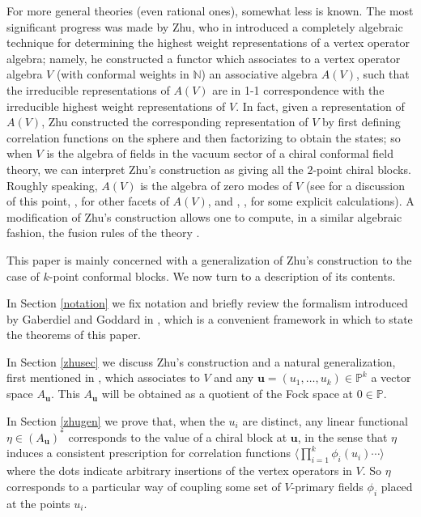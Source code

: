 \documentclass[a4paper,12pt]{article}
\newcommand{\N}{{\mathbb N}}
\newcommand{\uu}{{\mathbf u}}
\newcommand{\PP}{{\mathbb P}}
\newcommand{\IP}[1]{\langle#1\rangle}
\begin{document}
For more general theories (even rational ones), somewhat less is known.
The most significant progress was made by Zhu,
who in \cite{Zhu} introduced a completely algebraic technique for determining the highest weight representations of
a vertex operator algebra; namely, he constructed a functor which associates to a vertex operator
algebra $V$ (with conformal weights in $\N$) 
an associative algebra $A(V)$,
such that the irreducible representations of $A(V)$ are in 1-1 correspondence
with the irreducible highest weight representations of $V$.  In fact, given a representation of $A(V)$,
Zhu constructed the corresponding representation
of $V$ by first defining correlation functions on the sphere and then factorizing to obtain the states;
so when $V$ is the algebra of fields in the vacuum sector of a chiral conformal field theory, we can interpret
Zhu's construction as giving all the $2$-point chiral blocks.
Roughly speaking, $A(V)$ is the algebra of zero
modes of $V$ (see \cite{NB} for a discussion of this point, \cite{DLM}, \cite{Li} for other
facets of $A(V)$, and \cite{FZ}, \cite{Lucke}, \cite{DLM2} for some explicit calculations).
A modification of Zhu's construction allows one
to compute, in a similar algebraic fashion, the fusion rules of the
theory \cite{FZ}.

This paper is mainly concerned with a generalization of Zhu's construction
to the case of $k$-point conformal blocks.  
We now turn to a description of its contents.

In Section \ref{notation} we fix notation
and briefly review the formalism introduced by Gaberdiel and Goddard in
\cite{GG}, which is a convenient framework in which to state the theorems
of this paper.

In Section \ref{zhusec} we discuss Zhu's construction and a natural generalization, 
first mentioned in \cite{GG},
which associates to $V$ and any $\uu = (u_1, \dots, u_k) \in \PP^k$ a vector space $A_\uu$.  This $A_\uu$ will be
obtained as a quotient of the Fock space at $0 \in \PP$.

In Section \ref{zhugen} we prove that, when the $u_i$ are distinct, any linear functional $\eta \in (A_\uu)^*$ 
corresponds to the value of
a chiral block at $\uu$, in the sense that $\eta$ induces a consistent
prescription for correlation functions
$\IP{\prod_{i=1}^k \phi_i(u_i) \cdots}$
where the dots indicate arbitrary insertions of the vertex operators in $V$.
So $\eta$ corresponds to a particular way of coupling some set of
$V$-primary fields $\phi_i$ placed at the points $u_i$.
\end{document}

